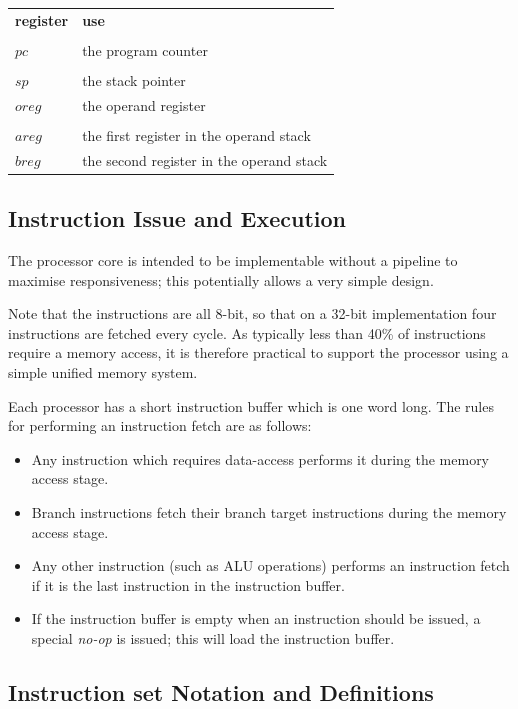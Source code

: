 \documentclass[a4paper, 12pt]{article}
\begin{document}
\begin{tabular}{ll}
{\bf register} & {\bf use}\\
&\\
$pc$ & the program counter\\
&\\
$sp$ & the stack pointer\\
$oreg$ & the operand register\\
&\\
$areg$ & the first register in the operand stack \\
$breg$ & the second register in the operand stack
\end{tabular}

\subsection*{Instruction Issue and Execution}

The processor core is intended to be implementable without
a pipeline to maximise responsiveness; this potentially allows
a very simple design. 

Note that the instructions are all 8-bit, so that on a 
32-bit implementation four instructions are fetched every cycle.
As typically less than 40\% of instructions require a memory
access, it is therefore practical to support the processor
using a simple unified memory system.

Each processor has a short instruction buffer which is one 
word long. The rules for performing an instruction 
fetch are as follows:

\begin{itemize}
\item Any instruction which requires data-access performs
it during the memory access stage.
\item Branch instructions fetch their branch target instructions
during the memory access stage. 
\item Any other instruction (such as ALU operations) 
performs an instruction fetch if it is the
last instruction in the instruction buffer. 
 \item If the instruction buffer is empty when an instruction 
should be issued, a special {\it no-op} is issued; this 
will load the instruction buffer. 
\end{itemize}

\subsection*{Instruction set Notation and Definitions}
\end{document}
